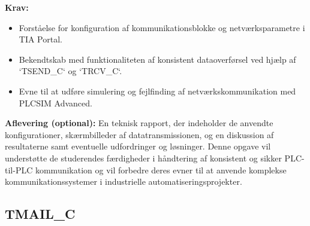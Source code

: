 \textbf{Krav:}
\begin{itemize}
	\item Forståelse for konfiguration af kommunikationsblokke og netværksparametre i TIA Portal.
	\item Bekendtskab med funktionaliteten af konsistent dataoverførsel ved hjælp af `TSEND\_C` og `TRCV\_C`.
	\item Evne til at udføre simulering og fejlfinding af netværkskommunikation med PLCSIM Advanced.
\end{itemize}

\textbf{Aflevering (optional):} En teknisk rapport, der indeholder de anvendte konfigurationer, skærmbilleder af datatransmissionen, og en diskussion af resultaterne samt eventuelle udfordringer og løsninger.
\newline\newline
\noindent Denne opgave vil understøtte de studerendes færdigheder i håndtering af konsistent og sikker PLC-til-PLC kommunikation og vil forbedre deres evner til at anvende komplekse kommunikationssystemer i industrielle automatiseringsprojekter.

\subsection*{TMAIL\_C}
\label{subsec:kommunikation_med_tmail_c}


